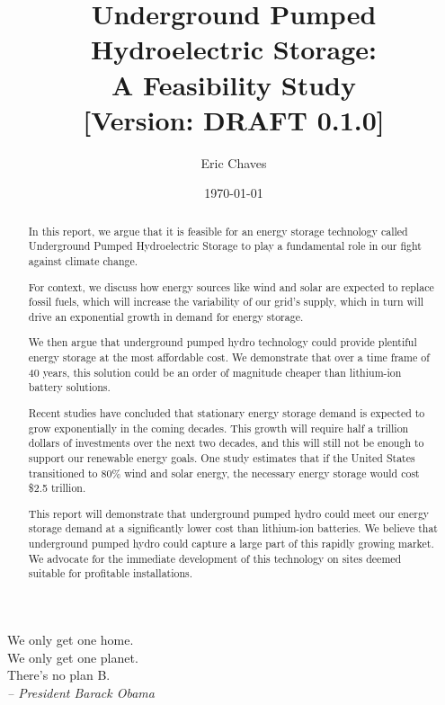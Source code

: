 \documentclass[hidelinks,12pt,a4paper]{article}
\title{%
  \LARGE Underground Pumped Hydroelectric Storage:\\
  \LARGE A Feasibility Study\\
  \bigskip
  \normalsize [Version: DRAFT 0.1.0]
}
\author{\large Eric Chaves}
\date{\large \today}
\begin{document}
\maketitle
\setlength{\parindent}{1em}
\setlength{\parskip}{1em}


\renewcommand{\abstractname}{Abstract}
\begin{abstract}
In this report, we argue that it is feasible for an energy storage technology called Underground Pumped Hydroelectric Storage to play a fundamental role in our fight against climate change.

For context, we discuss how energy sources like wind and solar are expected to replace fossil fuels, which will increase the variability of our grid's supply, which in turn will drive an exponential growth in demand for energy storage.

We then argue that underground pumped hydro technology could provide plentiful energy storage at the most affordable cost. We demonstrate that over a time frame of 40 years, this solution could be an order of magnitude cheaper than lithium-ion battery solutions.

Recent studies have concluded that stationary energy storage demand is expected to grow exponentially in the coming decades. This growth will require half a trillion dollars of investments over the next two decades, and this will still not be enough to support our renewable energy goals. One study estimates that if the United States transitioned to 80\% wind and solar energy, the necessary energy storage would cost \$2.5 trillion. \cite{TheTwoPointFiveTrillionReasonWeCantRelyOnBatteries}

This report will demonstrate that underground pumped hydro could meet our energy storage demand at a significantly lower cost than lithium-ion batteries. We believe that underground pumped hydro could capture a large part of this rapidly growing market. We advocate for the immediate development of this technology on sites deemed suitable for profitable installations.
\end{abstract}


\pagebreak
\begin{center}
\hspace{20pt}
\vfill
We only get one home. \\ We only get one planet. \\ There’s no plan B. \\
\bigskip
\textit{-- President Barack Obama}\cite{ObamaIssuesChallengeOnClimateChangeWithPowerPlantRule}
\vfill
\hspace{0pt}
\end{center}
\end{document}

